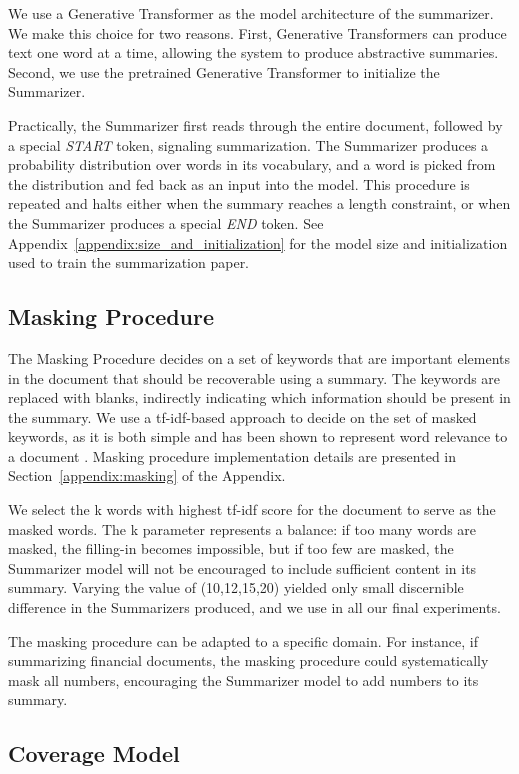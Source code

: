 \documentclass[11pt,a4paper]{article}
\begin{document}
We use a Generative Transformer \cite{radford2019language} as the model architecture of the summarizer. We make this choice for two reasons. First, Generative Transformers can produce text one word at a time, allowing the system to produce abstractive summaries.
Second, we use the pretrained Generative Transformer to initialize the Summarizer.

Practically, the Summarizer first reads through the entire document, followed by a special \textit{START} token, signaling  summarization. The Summarizer produces a probability distribution over words in its vocabulary, and a word is picked from the distribution and fed back as an input into the model. This procedure is repeated and halts either when the summary reaches a length constraint, or when the Summarizer produces a special \textit{END} token. See Appendix~\ref{appendix:size_and_initialization} for the model size and initialization used to train the summarization paper.

\subsection{Masking Procedure}
\label{section:masking_procedure}
The Masking Procedure decides on a set of keywords that are important elements in the document that should be recoverable using a summary. The keywords are replaced with blanks, indirectly indicating which information should be present in the summary.
We use a tf-idf-based approach to decide on the set of masked keywords, as it is both simple and has been shown to represent word relevance to a document \cite{Ramos2003UsingTT}. Masking procedure implementation details are presented in Section~\ref{appendix:masking} of the Appendix.

We select the k words with highest tf-idf score for the document to serve as the masked words. The k parameter represents a balance: if too many words are masked, the filling-in becomes impossible, but if too few are masked, the Summarizer model will not be encouraged to include sufficient content in its summary. Varying the value of  (10,12,15,20) yielded only small discernible difference in the Summarizers produced, and we use  in all our final experiments. 

The masking procedure can be adapted to a specific domain. For instance, if summarizing financial documents, the masking procedure could systematically mask all numbers, encouraging the Summarizer model to add numbers to its summary.

\subsection{Coverage Model}
\label{section:coverage_model}
\end{document}
